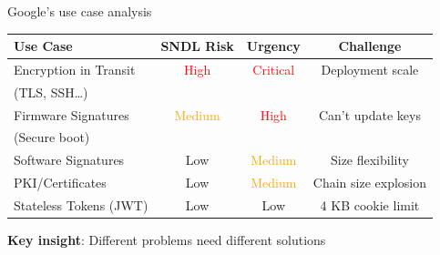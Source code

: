 \ifdefined\PRESENTATION\else\PassOptionsToClass{handout}{beamer}\fi\documentclass[aspectratio=169, lualatex]{beamer}
\begin{document}
\begin{frame}{Google's use case analysis}
	\begin{center}
		\begin{tabular}{|l|c|c|c|}
			\hline
			\textbf{Use Case}      & \textbf{SNDL Risk}              & \textbf{Urgency}                & \textbf{Challenge}   \\
			\hline
			\hline
			Encryption in Transit  & \textcolor{red}{High}           & \textcolor{red}{Critical}       & Deployment scale     \\
			(TLS, SSH\ldots)       &                                 &                                 &                      \\
			\hline
			Firmware Signatures    & \textcolor{orange}{Medium}      & \textcolor{red}{High}           & Can't update keys    \\
			(Secure boot)          &                                 &                                 &                      \\
			\hline
			Software Signatures    & \textcolor{green!70!black}{Low} & \textcolor{orange}{Medium}      & Size flexibility     \\
			\hline
			PKI/Certificates       & \textcolor{green!70!black}{Low} & \textcolor{orange}{Medium}      & Chain size explosion \\
			\hline
			Stateless Tokens (JWT) & \textcolor{green!70!black}{Low} & \textcolor{green!70!black}{Low} & 4 KB cookie limit    \\
			\hline
		\end{tabular}
	\end{center}
	\textbf{Key insight}: Different problems need different solutions
\end{frame}
\end{document}
